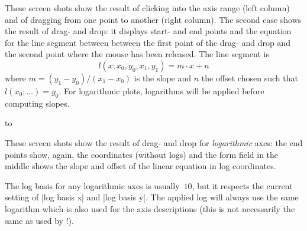 	\nobreak
	These screen shots show the result of clicking into the axis range (left column) and of dragging from one point to another (right column). The second case shows the result of drag- and drop: it displays start- and end points and the equation for the line segment between between the first point of the drag- and drop and the second point where the mouse has been released. The line segment is 
	\[ l(x; x_0,y_0,x_1,y_1) = m \cdot x + n \]
	where $m = (y_1-y_0) / (x_1-x_0)$ is the slope and $n$ the offset chosen such that $l(x_0;\dotsc) = y_0$. For logarithmic plots, logarithms will be applied before computing slopes. 

	\noindent
	\hbox to %

	\nobreak
	These screen shots show the result of drag- and drop for \emph{logarithmic} axes: the end points show, again, the coordinates (without logs) and the form field in the middle shows the slope and offset of the linear equation in log coordinates.

	The log basis for any logarithmic axes is usually~$10$, but it respects the current setting of |log basis x| and |log basis y|. The applied log will always use the same logarithm which is also used for the axis descriptions (this is not necessarily the same as used by \PGFPlotstable!).


